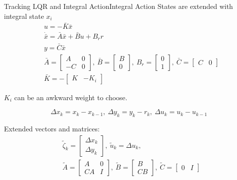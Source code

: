 \begin{frame}{Tracking LQR and Integral Action}{Integral Action}
	States are extended with integral state $x_i$
	\begin{align}\label{eq:ClassicalIntegralAction}
		&u = -\bar{K}\bar{x} \\
		&\dot{\bar{x}} = \bar{A}\bar{x} + \bar{B}u + B_r r \\ 
		&y = \bar{C}\bar{x}\\
		&\bar{A} = \begin{bmatrix}A & 0 \\ -C & 0 \end{bmatrix}, \ \bar{B} = \begin{bmatrix} B \\ 0 \end{bmatrix}, \ B_r = \begin{bmatrix} 0 \\ 1 \end{bmatrix}, \ \bar{C} = \begin{bmatrix} C & 0 \end{bmatrix}\\
		& \bar{K} = -\begin{bmatrix} K & -K_i \end{bmatrix}
	\end{align}

	$K_i$ can be an awkward weight to choose.
\end{frame}

	\begin{equation}\label{eq:VelocityVariables}
		\Delta x_k = x_k - x_{k-1}, \ \Delta y_k = y_k - r_k, \ \Delta u_k = u_k-u_{k-1}
	\end{equation}
	
	Extended vectors and matrices:
	\begin{equation} \label{eq1}
		\begin{split}
			& \tilde{\zeta}_k = \begin{bmatrix} \Delta x_k \\ \Delta y_k	\end{bmatrix}, \ \tilde{u}_k = \Delta u_k, \\
			&\tilde{A} = \begin{bmatrix} A & 0 \\ CA & I	\end{bmatrix}, \ 
			\tilde{B} = \begin{bmatrix} B \\ CB	\end{bmatrix}, \ \tilde{C} = \begin{bmatrix} 0 & I	\end{bmatrix}
		\end{split}
	\end{equation}

